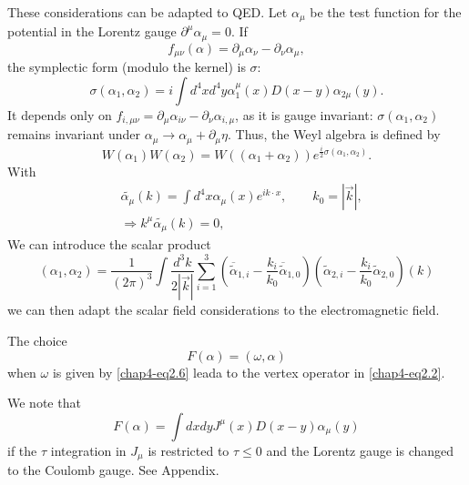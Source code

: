 These considerations can be adapted to QED. Let $\alpha_\mu$ be the test function for the potential in the Lorentz gauge $\partial^\mu \alpha_\mu =0$. If
\begin{equation}
f_{\mu \nu} (\alpha) = \partial_{\mu} \alpha_{\nu}- \partial_\nu \alpha_\mu, \label{chap4-eq-2.27}
\end{equation}
the symplectic form (modulo the kernel) is $\sigma:$
\begin{equation}
  \sigma (\alpha_1, \alpha_2) = i \int d^4 x d^4 y \alpha^\mu_1 (x) D (x-y) \alpha_{2 \mu} (y). \label{chap4-eq2.28}
\end{equation}
It depends only on $f_{i, \mu \nu}= \partial_\mu \alpha_{i \nu}- \partial_\nu \alpha_{i, \mu}$, as it is gauge invariant: $\sigma(\alpha_1, \alpha_2)$ remains invariant under $\alpha_\mu \to \alpha_\mu + \partial_{\mu} \eta$. Thus, the Weyl algebra is defined by
\begin{equation}
W (\alpha_1) W (\alpha_2)= W ((\alpha_1 + \alpha_2)) e^{\frac{i}{2} \sigma(\alpha_1, \alpha_2)}. \label{chap4-eq2.29}
\end{equation}
With
\begin{align}
  &\tilde{\alpha_\mu} (k) = \int d^4 x \alpha_\mu (x)e^{ik\cdot x}, \qquad k_0 = |\overrightarrow{k}|,\label{chap4-eq2.30}\\
  &\Longrightarrow k^{\mu} \tilde{\alpha_\mu} (k)=0,\label{chap4-eq2.31}
\end{align}
We can introduce the scalar product
\begin{equation}
(\alpha_1, \alpha_2)= \frac{1}{(2\pi)^3} \int \frac{d^3 k}{2|\overrightarrow{k}|} \sum^3_{i=1} \left(\overline{\tilde{\alpha}}_{1, i} -  \frac{k_i}{k_0} \overline{\tilde{\alpha}}_{1, 0}\right) (\tilde{\alpha}_{2, i}- \frac{k_i}{k_0} \tilde{\alpha}_{2, 0})(k) \label{chap4-eq2.32}
\end{equation}
we can then adapt the scalar field considerations to the electromagnetic field.

The choice
\begin{equation}
F(\alpha) = (\omega, \alpha) \label{chap4-eq2.33}
\end{equation}
when $\omega$ is given by \eqref{chap4-eq2.6} leada to the vertex operator in \eqref{chap4-eq2.2}.

We note that
\begin{equation}
F(\alpha) = \int dx dy {J}^\mu (x) {D}(x-y) \alpha_\mu (y) \label{chap4-eq2.34}
\end{equation}
if the $\tau$ integration in ${J}_\mu$ is restricted to $\tau \leq 0$ and the Lorentz gauge is changed to the Coulomb gauge. See Appendix.

